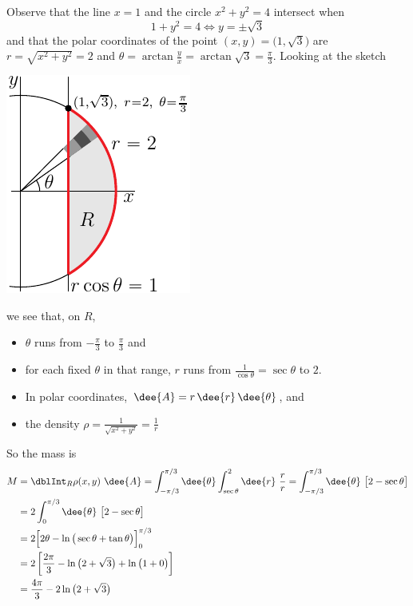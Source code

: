 \begin{solution}
Observe that the line $x=1$ and the circle $x^2+y^2=4$ 
intersect when
\begin{equation*}
1+y^2=4 
\iff y=\pm\sqrt{3}
\end{equation*}
and that the polar coordinates of the point $(x,y)=\big(1,\sqrt{3}\big)$
are $r=\sqrt{x^2+y^2}=2$ and $\theta=\arctan\frac{y}{x}=\arctan \sqrt{3}
=\frac{\pi}{3}$. Looking at the sketch 
\begin{center}
     \includegraphics{fig/OE08D_7w.pdf}
\end{center}
we see that, on $R$,
\begin{itemize}
\item
$\theta$ runs from $-\frac{\pi}{3}$ to $\frac{\pi}{3}$ and
\item
for each fixed $\theta$ in that range, $r$ runs from $\frac{1}{\cos\theta}
=\sec\theta$ to $2$.
\item
In polar coordinates, $\dee{A}=r\,\dee{r}\,\dee{\theta}$, and
\item 
the density $\rho =\frac{1}{\sqrt{x^2+y^2}} =\frac{1}{r}$
\end{itemize}
So the mass is
\begin{align*}
M&=\dblInt_R \rho(x,y)\ \dee{A}
=\int_{-\pi/3}^{\pi/3}\dee{\theta}\int_{\sec\theta}^2\dee{r}\ \frac{r}{r}
=\int_{-\pi/3}^{\pi/3}\dee{\theta}\ \big[2-\sec\theta\big] \\
&=2\int_0^{\pi/3}\dee{\theta}\ \big[2-\sec\theta\big] \\
&= 2\Big[2\theta - \ln\big(\sec\theta+\tan\theta\big)\Big]_0^{\pi/3} \\
&= 2\left[\frac{2\pi}{3} - \ln\big(2+\sqrt{3}\big)
            + \ln\big(1+0\big)\right] \\
&= \frac{4\pi}{3} - 2\ln\big(2+\sqrt{3}\big)
\end{align*}



\end{solution}
